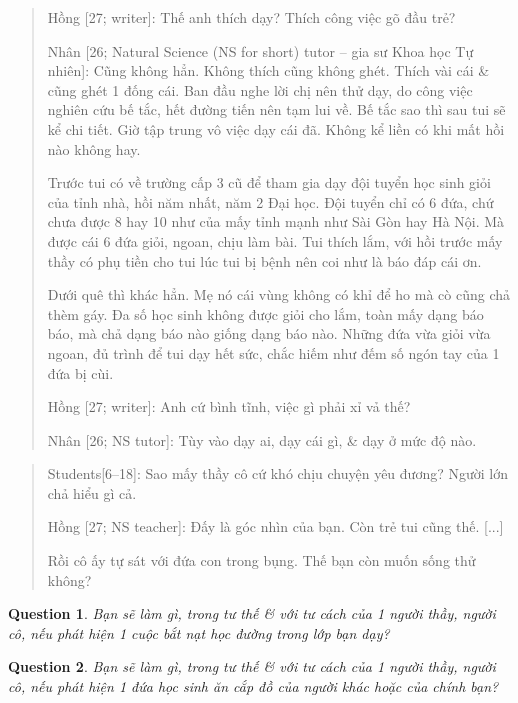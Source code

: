 \documentclass[12pt]{article}
\newtheorem{question}{Question}
\begin{document}
\begin{quotation}
	{\sf Hồng [27; writer]}: Thế anh thích dạy? Thích công việc gõ đầu trẻ?
	
	{\sf Nhân [26; Natural Science (NS for short) tutor -- gia sư Khoa học Tự nhiên]}: Cũng không hẳn. Không thích cũng không ghét. Thích vài cái \& cũng ghét 1 đống cái. Ban đầu nghe lời chị nên thử dạy, do công việc nghiên cứu bế tắc, hết đường tiến nên tạm lui về. Bế tắc sao thì sau tui sẽ kể chi tiết. Giờ tập trung vô việc dạy cái đã. Không kể liền có khi mất hồi nào không hay.
	
	Trước tui có về trường cấp 3 cũ để tham gia dạy đội tuyển học sinh giỏi của tỉnh nhà, hồi năm nhất, năm 2 Đại học. Đội tuyển chỉ có 6 đứa, chứ chưa được 8 hay 10 như của mấy tỉnh mạnh như Sài Gòn hay Hà Nội. Mà được cái 6 đứa giỏi, ngoan, chịu làm bài. Tui thích lắm, với hồi trước mấy thầy có phụ tiền cho tui lúc tui bị bệnh nên coi như là báo đáp cái ơn.
	
	Dưới quê thì khác hẳn. Mẹ nó cái vùng không có khỉ để ho mà cò cũng chả thèm gáy. Đa số học sinh không được giỏi cho lắm, toàn mấy dạng báo báo, mà chả dạng báo nào giống dạng báo nào. Những đứa vừa giỏi vừa ngoan, đủ trình để tui dạy hết sức, chắc hiếm như đếm số ngón tay của 1 đứa bị cùi.
	
	{\sf Hồng [27; writer]}: Anh cứ bình tĩnh, việc gì phải xỉ vả thế?
	
	{\sf Nhân [26; NS tutor]}: Tùy vào dạy ai, dạy cái gì, \& dạy ở mức độ nào.	
\end{quotation}

\begin{quotation}
	{\sf Students[6--18]}: Sao mấy thầy cô cứ khó chịu chuyện yêu đương? Người lớn chả hiểu gì cả.
	
	{\sf Hồng [27; NS teacher]}: Đấy là góc nhìn của bạn. Còn trẻ tui cũng thế. [...]
	
	Rồi cô ấy tự sát với đứa con trong bụng. Thế bạn còn muốn sống thử không?
\end{quotation}

\begin{question}
	Bạn sẽ làm gì, trong tư thế \& với tư cách của 1 người thầy, người cô, nếu phát hiện 1 cuộc bắt nạt học đường trong lớp bạn dạy?
\end{question}

\begin{question}
	Bạn sẽ làm gì, trong tư thế \& với tư cách của 1 người thầy, người cô, nếu phát hiện 1 đứa học sinh ăn cắp đồ của người khác hoặc của chính bạn?
\end{question}
\end{document}
